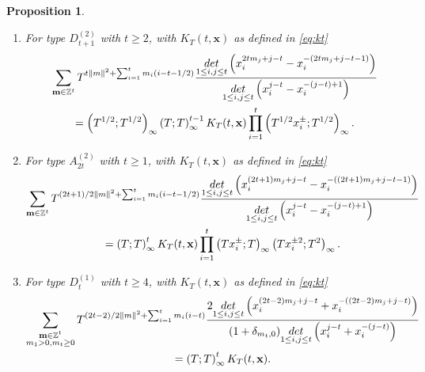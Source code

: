 \documentclass[11pt,letterpaper]{amsart}
\def\bbbz{\mathbb Z}
\def\det{{\rm det}}
\def\sgn{{\rm sgn}}
\newtheorem{prop}[df]{Proposition}		%
\numberwithin{equation}{section}
\numberwithin{df}{section}
\begin{document}
\begin{prop}
\begin{enumerate}
\item For type $D^{(2)}_{t+1}$ with $t\geq 2$,  with $K_T(t,\mathbf{x})$ as defined in \eqref{eq:kt}
\begin{multline}
\sum_{\mathbf{m}\in\bbbz^t}T^{t\lVert m\rVert^2+\sum_{i=1}^tm_i(i-t-1/2)}\frac{\underset{1\le i,j\le t}{\det}\left(x_i^{2tm_j+j-t}-x_i^{-(2tm_j+j-t-1)}\right)}{\underset{1\le i,j\le t}{\det}\left(x_i^{j-t}-x_i^{-(j-t)+1}\right)}\\
=\left(T^{1/2};T^{1/2}\right)_\infty\left(T;T\right)_\infty^{t-1}
K_T(t,{\bf x})\prod_{i=1}^t \left(T^{1/2}x_i^{\pm};T^{1/2}\right)_\infty .\label{eq:misigncv}
\end{multline}

\item For type $A^{(2)}_{2t}$ with $t\geq 1$,  with $K_T(t,\mathbf{x})$ as defined in \eqref{eq:kt}
\begin{multline}
\sum_{\mathbf{m}\in\bbbz^t}T^{(2t+1)/2\lVert m\rVert^2+\sum_{i=1}^tm_i(i-t-1/2)}
\frac{\underset{1\le i,j\le t}{\det}\left(x_i^{(2t+1)m_j+j-t}-x_i^{-((2t+1)m_j+j-t-1)}\right)}{\underset{1\le i,j\le t}{\det}\left(x_i^{j-t}-x_i^{-(j-t)+1}\right)}
\\=\left(T;T\right)_\infty^{t} K_T(t,\mathbf{x})\prod_{i=1}^t\left(Tx_i^{\pm};T\right)_\infty\left(Tx_i^{\pm 2};T^2\right)_\infty.\label{eq:misignbc}
\end{multline}


\item For type $D^{(1)}_{t}$ with $t\geq 4$,  with $K_T(t,\mathbf{x})$ as defined in \eqref{eq:kt}
\begin{multline}
\sum_{\substack{\mathbf{m}\in\bbbz^{t}\\m_1>0,m_t\geq 0}}T^{(2t-2)/2\lVert m\rVert^2+\sum_{i=1}^tm_i(i-t)}
\frac{2\underset{1\le i,j\le t}{\det}\left(x_i^{(2t-2)m_j+j-t}+x_i^{-((2t-2)m_j+j-t)}\right)}{(1+\delta_{m_t,0})\underset{1\le i,j\le t}{\det}\left(x_i^{j-t}+x_i^{-(j-t)}\right)}
\\=\left(T;T\right)_\infty^{t} K_T(t,\mathbf{x}).\label{eq:misignd}
\end{multline}

\end{enumerate}

\end{prop}
\end{document}
